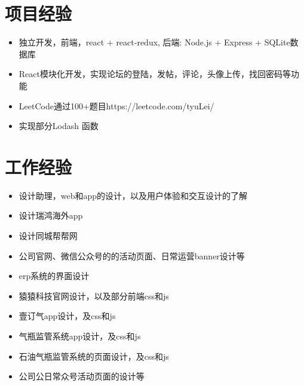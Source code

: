\documentclass{resume}
\begin{document}


 


\section{项目经验}
\begin{itemize}
  \item 独立开发，前端，react + react-redux, 后端: Node.js + Express + SQLite数据库
  \item React模块化开发，实现论坛的登陆，发帖，评论，头像上传，找回密码等功能
  \item LeetCode通过100+题目https://leetcode.com/tyuLei/
  \item 实现部分Lodash 函数
\end{itemize}

\section{工作经验}
\begin{itemize}
  \item 设计助理，web和app的设计，以及用户体验和交互设计的了解
\end{itemize}
\begin{itemize}
  \item 设计瑞鸿海外app
  \item 设计同城帮帮网
  \item 公司官网、微信公众号的的活动页面、日常运营banner设计等
\end{itemize}
\begin{itemize}
  \item erp系统的界面设计
  \item 猿猿科技官网设计，以及部分前端css和js
\end{itemize}
\begin{itemize}
  \item 壹订气app设计，及css和js
  \item 气瓶监管系统app设计，及css和js
  \item 石油气瓶监管系统的页面设计，及css和js
  \item 公司公日常众号活动页面的设计等
\end{itemize}
\end{document}
